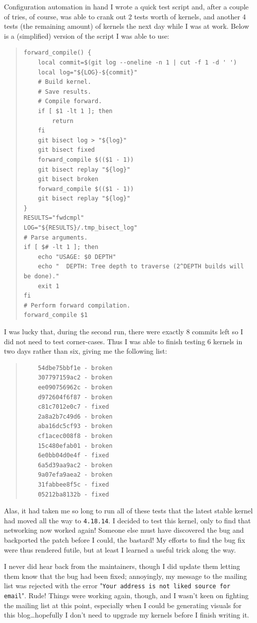 \documentclass{article}
\begin{document}
Configuration automation in hand I wrote a quick test script and, after a couple of tries, of course, was able to crank out 2 tests worth of kernels, and another 4 tests (the remaining amount) of kernels the next day while I was at work.  Below is a (simplified) version of the script I was able to use:
\begin{quote}
\begin{verbatim}
forward_compile() {
	local commit=$(git log --oneline -n 1 | cut -f 1 -d ' ')
	local log="${LOG}-${commit}"
	# Build kernel.
	# Save results.
	# Compile forward.
	if [ $1 -lt 1 ]; then
		return
	fi
	git bisect log > "${log}"
	git bisect fixed
	forward_compile $(($1 - 1))
	git bisect replay "${log}"
	git bisect broken
	forward_compile $(($1 - 1))
	git bisect replay "${log}"
}
RESULTS="fwdcmpl"
LOG="${RESULTS}/.tmp_bisect_log"
# Parse arguments.
if [ $# -lt 1 ]; then
	echo "USAGE: $0 DEPTH"
	echo "  DEPTH: Tree depth to traverse (2^DEPTH builds will be done)."
	exit 1
fi
# Perform forward compilation.
forward_compile $1
\end{verbatim}
\end{quote}
I was lucky that, during the second run, there were exactly 8 commits left so I did not need to test corner-cases.  Thus I was able to finish testing 6 kernels in two days rather than six, giving me the following list:
\begin{quote}
\begin{verbatim}
	54dbe75bbf1e - broken
	307797159ac2 - broken
	ee090756962c - broken
	d972604f6f87 - broken
	c81c7012e0c7 - fixed
	2a8a2b7c49d6 - broken
	aba16dc5cf93 - broken
	cf1acec008f8 - broken
	15c480efab01 - broken
	6e0bb04d0e4f - fixed
	6a5d39aa9ac2 - broken
	9a07efa9aea2 - broken
	31fabbee8f5c - fixed
	05212ba8132b - fixed
\end{verbatim}
\end{quote}

Alas, it had taken me so long to run all of these tests that the latest stable kernel had moved all the way to \texttt{4.18.14}.  I decided to test this kernel, only to find that networking now worked again!  Someone else must have discovered the bug and backported the patch before I could, the bastard!  My efforts to find the bug fix were thus rendered futile, but at least I learned a useful trick along the way.

I never did hear back from the maintainers, though I did update them letting them know that the bug had been fixed; annoyingly, my message to the mailing list was rejected with the error "\texttt{Your address is not liked source for email}".  Rude!  Things were working again, though, and I wasn't keen on fighting the mailing list at this point, especially when I could be generating visuals for this blog\ldots hopefully I don't need to upgrade my kernels before I finish writing it.
\end{document}
